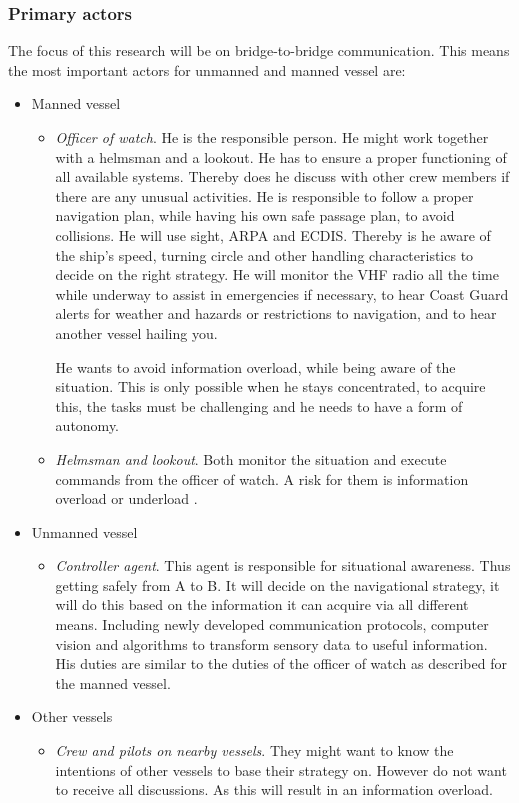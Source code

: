 \subsubsection{Primary actors}
The focus of this research will be on bridge-to-bridge communication. This means the most important actors for unmanned and manned vessel are:
\begin{itemize}
	\item Manned vessel
	\begin{itemize}
		\item \emph{Officer of watch}. He is the responsible person. He might work together with a helmsman and a lookout. He has to ensure a proper functioning of all available systems. Thereby does he discuss with other crew members if there are any unusual activities. He is responsible to follow a proper navigation plan, while having his own safe passage plan, to avoid collisions. He will use sight, \acf{ARPA} and \acf{ECDIS}. Thereby is he aware of the ship's speed, turning circle and other handling characteristics to decide on the right strategy. He will monitor the \ac{VHF} radio all the time while underway to assist in emergencies if necessary, to hear Coast Guard alerts for weather and hazards or restrictions to navigation, and to hear another vessel hailing you.
		
		He wants to avoid information overload, while being aware of the situation. This is only possible when he stays concentrated, to acquire this, the tasks must be challenging and he needs to have a form of autonomy.
	
		\item \emph{Helmsman and lookout}. Both monitor the situation and execute commands from the officer of watch. A risk for them is information overload or underload \cite{Neerincx2008}.
	\end{itemize}
		
	\item Unmanned vessel
	\begin{itemize}
		\item \emph{Controller agent}. This agent is responsible for situational awareness. Thus getting safely from A to B. It will decide on the navigational strategy, it will do this based on the information it can acquire via all different means. Including newly developed communication protocols, computer vision and algorithms to transform sensory data to useful information. His duties are similar to the duties of the officer of watch as described for the manned vessel.
	\end{itemize}

	\item Other vessels
	\begin{itemize}
		\item \emph{Crew and pilots on nearby vessels}. They might want to know the intentions of other vessels to base their strategy on. However do not want to receive all discussions. As this will result in an information overload.
	\end{itemize}
	
\end{itemize}

